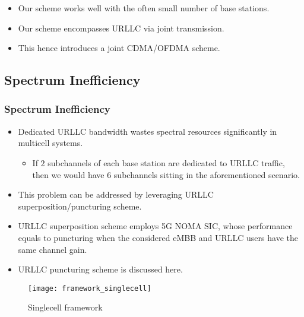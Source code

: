 \begin{frame}
  \begin{itemize}
    \item Our scheme works well with the often small number of base stations.
    \item Our scheme encompasses URLLC  via joint transmission.
    \item This hence introduces a joint CDMA/OFDMA scheme.
  \end{itemize}
\end{frame}

\subsection{Spectrum Inefficiency}
\begin{frame}
  \frametitle{Spectrum Inefficiency}
  \begin{itemize}
    \item Dedicated URLLC bandwidth wastes spectral resources significantly in multicell systems.
      \begin{itemize}
        \item If $2$ subchannels of each base station are dedicated to URLLC traffic, then we would have $6$ subchannels sitting  in the aforementioned scenario.
      \end{itemize}
  \end{itemize}
\end{frame}

\begin{frame}
  \begin{itemize}
    \item This problem can be addressed by leveraging URLLC superposition/puncturing scheme. %
    \item URLLC superposition scheme employs 5G NOMA SIC, whose performance equals to puncturing when the considered eMBB and URLLC users have the same channel gain. %
    \item URLLC puncturing scheme is discussed here.
  \end{itemize}
\end{frame}

\begin{frame}
  \begin{figure}
    \texttt{[image: framework\_singlecell]}
    \caption{Singlecell framework}
  \end{figure}
\end{frame}
